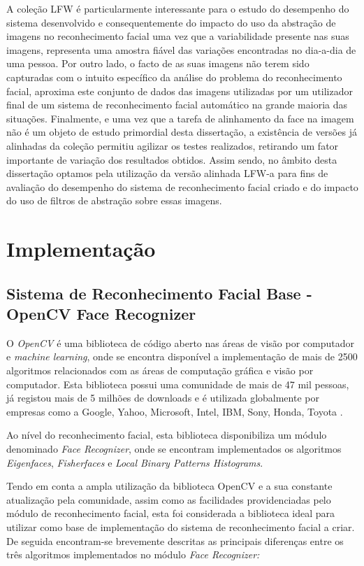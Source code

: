 A coleção LFW é particularmente interessante para o estudo do desempenho do sistema desenvolvido e consequentemente do impacto do uso da abstração de imagens no reconhecimento facial uma vez que a variabilidade presente nas suas imagens, representa uma amostra fiável das variações encontradas no dia-a-dia de uma pessoa. Por outro lado, o facto de as suas imagens não terem sido capturadas com o intuito específico da análise do problema do reconhecimento facial, aproxima este conjunto de dados das imagens utilizadas por um utilizador final de um sistema de reconhecimento facial automático na grande maioria das situações. Finalmente, e uma vez que a tarefa de alinhamento da face na imagem não é um objeto de estudo primordial desta dissertação, a existência de versões já alinhadas da coleção permitiu agilizar os testes realizados, retirando um fator importante de variação dos resultados obtidos. Assim sendo, no âmbito desta dissertação optamos pela utilização da versão alinhada LFW-a \citep{autor} para fins de avaliação do desempenho do sistema de reconhecimento facial criado e do impacto do uso de filtros de abstração sobre essas imagens.

\section{Implementação}

\subsection{Sistema de Reconhecimento Facial Base - OpenCV Face Recognizer}
O \textit{OpenCV} é uma biblioteca de código aberto nas áreas de visão por computador e \textit{machine learning}, onde se encontra disponível a implementação de mais de 2500 algoritmos relacionados com as áreas de computação gráfica e visão por computador. Esta biblioteca possui uma comunidade de mais de 47 mil pessoas, já registou mais de 5 milhões de downloads e é utilizada globalmente por empresas como a Google, Yahoo, Microsoft, Intel, IBM, Sony, Honda, Toyota \cite{Team}. 

Ao nível do reconhecimento facial, esta biblioteca disponibiliza um módulo denominado \textit{Face Recognizer}, onde se encontram implementados os algoritmos \textit{Eigenfaces}, \textit{Fisherfaces} e \textit{Local Binary Patterns Histograms}.

Tendo em conta a ampla utilização da biblioteca OpenCV e a sua constante atualização pela comunidade, assim como as facilidades providenciadas pelo módulo de reconhecimento facial, esta foi considerada a biblioteca ideal para utilizar como base de implementação do sistema de reconhecimento facial a criar. De seguida encontram-se brevemente descritas as principais diferenças entre os três algoritmos implementados no módulo \textit{Face Recognizer:}

